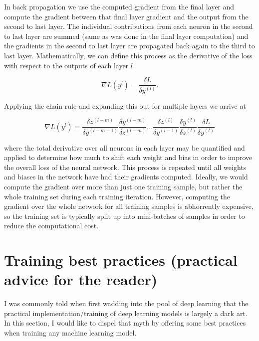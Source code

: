 %
%
In back propagation we use the computed gradient from the final layer and compute the gradient between that final layer gradient and the output from the second to last layer. The individual contributions from each neuron in the second to last layer are summed (same as was done in the final layer computation) and the gradients in the second to last layer are propagated back again to the third to last layer. Mathematically, we can define this process as the derivative of the loss with respect to the outputs of each layer $l$

\begin{equation}
    \nabla L(y^{l}) = \frac{\delta L}{\delta y^{(l)}}.
\end{equation}{}

Applying the chain rule and expanding this out for multiple layers we arrive at

\begin{equation}
    \nabla L(y^{l}) = \frac{\delta z^{(l-m)}}{\delta y^{(l-m-1)}} \frac{\delta y^{(l-m)}}{\delta z^{(l-m)}} ... \frac{\delta z^{(l)}}{\delta y^{(l-1)}} \frac{\delta y^{(l)}}{\delta z^{(l)}} \frac{\delta L}{\delta y^{(l)}} 
\end{equation}{}

where the total derivative over all neurons in each layer may be quantified and applied to determine how much to shift each weight and bias in order to improve the overall loss of the neural network. This process is repeated until all weights and biases in the network have had their gradients computed. Ideally, we would compute the gradient over more than just one training sample, but rather the whole training set during each training iteration. However, computing the gradient over the whole network for all training samples is abhorrently expensive, so the training set is typically split up into mini-batches of samples in order to reduce the computational cost.

%
%
\section{Training best practices (practical advice for the reader)}

I was commonly told when first wadding into the pool of deep learning that the practical implementation/training of deep learning models is largely a dark art. In this section, I would like to dispel that myth by offering some best practices when training any machine learning model.

